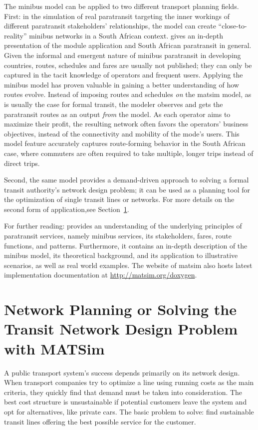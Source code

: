 The minibus model can be applied to two different transport planning fields. First: in the simulation of real paratransit targeting the inner workings of different paratransit stakeholders' relationships, the model can create ``close-to-reality'' minibus networks in a South African context. \citet[][]{NeumannEtAl2014MinibusRSA} gives an in-depth presentation of the module application and South African paratransit in general. Given the informal and emergent nature of minibus paratransit in developing countries, routes, schedules and fares are usually not published; they can only be captured in the tacit knowledge of operators and frequent users. Applying the minibus model has proven valuable in gaining a better understanding of how routes evolve. Instead of imposing routes and schedules \emph{on} the \gls{matsim} model, as is usually the case for formal transit, the modeler observes and gets the paratransit routes as an output \emph{from} the model. As each operator aims to maximize their profit, the resulting network often favors the operators' business objectives, instead of the connectivity and mobility of the mode's users. This model feature accurately captures route-forming behavior in the South African case, where commuters are often required to take multiple, longer trips instead of direct trips.

Second, the same model provides a demand-driven approach to solving a formal transit authority's network design problem; it can be used as a planning tool for the optimization of single transit lines or networks. For more details on the second form of application,see Section~\ref{sec:paratransit_application}.

For further reading: \citet[][]{Neumann2014PhD} provides an understanding of the underlying principles of paratransit services, namely minibus services, its stakeholders, fares, route functions, and patterns. Furthermore, it contains an in-depth description of the minibus model, its theoretical background, and its application to illustrative scenarios, as well as real world examples. The website of \gls{matsim} also hosts latest implementation documentation at \url{http://matsim.org/doxygen}.

\chapter{Network Planning or Solving the Transit Network Design Problem with MATSim}
\label{sec:paratransit_application}
%
A public transport system's success depends primarily on its network design. When transport companies try to optimize a line using running costs as the main criteria, they quickly find that demand must be taken into consideration. The best cost structure is unsustainable if potential customers leave the system and opt for alternatives, like private cars. The basic problem to solve: find sustainable transit lines offering the best possible service for the customer.

